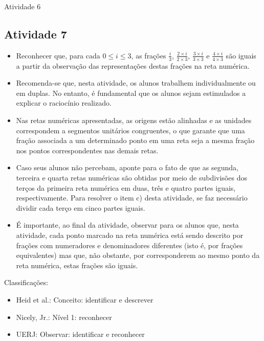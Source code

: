 \documentclass[oneside]{book}
\begin{document}
\begin{multicols}{2}
\begin{resposta*}{Atividade 6}
 
\end{resposta*}

\subsection{Atividade 7}

\begin{itemize} %
    \item       Reconhecer que, para cada       $0 \leq i \leq 3$, as frações    
   $\frac{i}{3}$,       $\frac{2 \times i}{2 \times 3 }$,       $\frac{3 \times 
i}{3 \times 3}$       e       $\frac{4 \times i}{4 \times 3}$       são iguais a 
partir da observação das representações destas frações na reta numérica.
\end{itemize} %
  
  
 
\begin{itemize} %
    \item       Recomenda-se que, nesta atividade, os alunos trabalhem 
individualmente ou em duplas. No entanto, é fundamental que os alunos sejam 
estimulados a explicar o raciocínio realizado.
    \item       Nas retas numéricas apresentadas, as origens estão alinhadas e 
as unidades correspondem a segmentos unitários congruentes, o que garante que 
uma fração associada a um determinado ponto em uma reta seja a mesma fração nos 
pontos correspondentes nas demais retas.
    \item       Caso seus alunos não percebam, aponte para o fato de que as 
segunda, terceira e quarta retas numéricas são obtidas por meio de subdivisões 
dos terços da primeira reta numérica em duas, três e quatro partes iguais, 
respectivamente. Para resolver o item c) desta atividade, se faz necessário 
dividir cada terço em cinco partes iguais.
    \item       É importante, ao final da atividade, observar para os alunos 
que, nesta atividade, cada ponto marcado na reta numérica está sendo descrito 
por frações com numeradores e denominadores diferentes (isto é, por frações 
equivalentes) mas que, não obstante, por corresponderem ao mesmo ponto da reta 
numérica, estas frações são iguais.
\end{itemize} %
  
  
  Classificações:  
\begin{itemize} %
    \item       Heid et al.: Conceito: identificar e descrever
    \item       Nicely, Jr.: Nível 1: reconhecer
    \item       UERJ: Observar: identificar e reconhecer
\end{itemize} %
  

\end{multicols}
\end{document}
